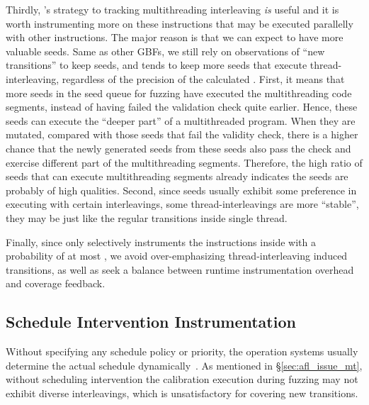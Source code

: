 Thirdly, \MTIns's strategy to tracking multithreading interleaving \emph{is} useful and it is worth instrumenting more on these instructions that may be executed parallelly with other instructions. The major reason is that we can expect to have more valuable seeds. Same as other GBFs, we still rely on observations of ``new transitions'' to keep seeds, and \MTIns tends to keep more seeds that execute thread-interleaving, regardless of the precision of the calculated \mtiscope. First, it means that more seeds in the seed queue for fuzzing have executed the multithreading code segments, instead of having failed the validation check quite earlier. Hence, these seeds can execute the ``deeper part'' of a multithreaded program. When they are mutated, compared with those seeds that fail the validity check, there is a higher chance that the newly generated seeds from these seeds also pass the check and exercise different part of the multithreading segments. Therefore, the high ratio of seeds that can execute multithreading segments already indicates the seeds are probably of high qualities. Second, since seeds usually exhibit some preference in executing with certain interleavings, some thread-interleavings are more ``stable'', they may be just like the regular transitions inside single thread.

Finally, since \MTIns only selectively instruments the instructions inside \mtiscope with a probability of at most \mtpnO, we avoid over-emphasizing thread-interleaving induced transitions, as well as seek a balance between runtime instrumentation overhead and coverage feedback. 













\subsection{Schedule Intervention Instrumentation}\label{sec:instrument_schedule}

Without specifying any schedule policy or priority, the operation systems usually determine the actual schedule dynamically~\cite{tlpi,posixstd}. As mentioned in \S\ref{sec:afl_issue_mt}, without scheduling intervention the calibration execution during fuzzing may not exhibit diverse interleavings, which is unsatisfactory for covering new transitions. 

